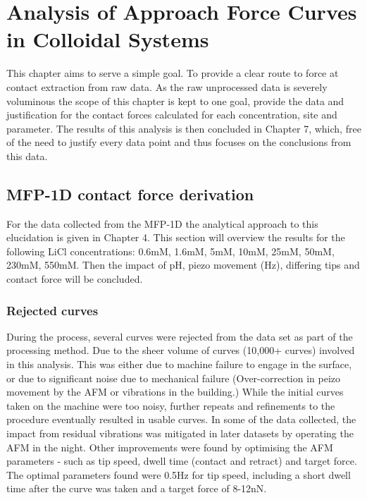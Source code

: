 


\chapter{Analysis of Approach Force Curves in Colloidal Systems}
\label{chap:approach_force_curves}

This chapter aims to serve a simple goal. To provide a clear route to force at contact extraction from raw data. As the raw unprocessed data is severely voluminous the scope of this chapter is kept to one goal, provide the data and justification for the contact forces calculated for each concentration, site and parameter. The results of this analysis is then concluded in Chapter 7, which, free of the need to justify every data point and thus focuses on the conclusions from this data. 

\section{MFP-1D contact force derivation}

For the data collected from the MFP-1D the analytical approach to this elucidation is given in Chapter 4. This section will overview the results for the following LiCl concentrations: 0.6mM, 1.6mM, 5mM, 10mM, 25mM, 50mM, 230mM, 550mM. Then the impact of pH, piezo movement (Hz), differing tips and contact force will be concluded.

\subsection{Rejected curves}

 During the process, several curves were rejected from the data set as part of the processing method. Due to the sheer volume of curves (10,000+ curves) involved in this analysis.  This was either due to machine failure to engage in the surface, or due to significant noise due to mechanical failure (Over-correction in peizo movement by the AFM or vibrations in the building.) While the initial curves taken on the machine were too noisy, further repeats and refinements to the procedure eventually resulted in usable curves. In some of the data collected, the impact from residual vibrations was mitigated in later datasets by operating the AFM in the night. Other improvements were found by optimising the AFM parameters  - such as tip speed, dwell time (contact and retract) and target force. The optimal parameters found were 0.5Hz for tip speed, including a short dwell time after the curve was taken and a target force of 8-12nN. 

